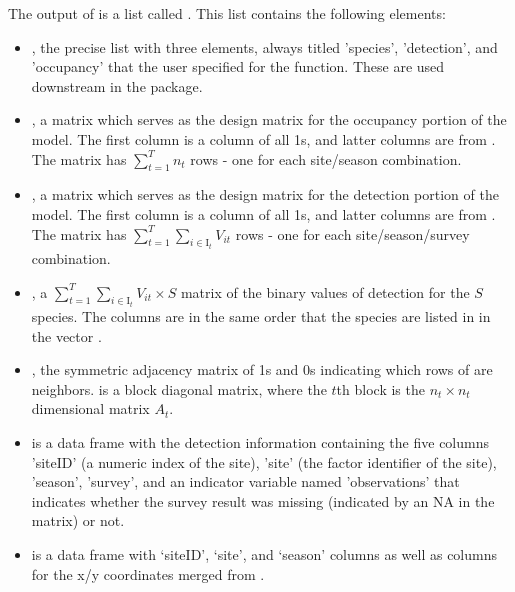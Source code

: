 The output of  is a list called .  This list contains the following elements:
\begin{itemize}
\item {}, the precise list with three elements, always titled 'species', 'detection', and 'occupancy' that the user specified for the  function.  These are used downstream in the package.

\item {}, a matrix which serves as the design matrix for the occupancy portion of the model.  The first column is a column of all 1s, and latter columns are from . The matrix has $\sum_{t=1}^T n_t$ rows - one for each site/season combination.
    
\item {}, a matrix which serves as the design matrix for the detection portion of the model.  The first column is a column of all 1s, and latter columns are from . The matrix has $\sum_{t=1}^T \sum_{i \in \mathrm{I}_t}V_{it}$ rows - one for each site/season/survey combination.
    
\item {}, a $\sum_{t=1}^T \sum_{i \in \mathrm{I}_t}V_{it} \times S$ matrix of the binary values of detection for the $S$ species. The columns are in the same order that the species are listed in in the vector .

\item {}, the symmetric adjacency matrix of 1s and 0s indicating which rows of  are neighbors.  is a block diagonal matrix, where the $t$th block is the $n_t \times n_t$ dimensional matrix $A_t$. 
    
\item {} is a data frame with the detection information containing the five columns 'siteID' (a numeric index of the site), 'site' (the factor identifier of the site), 'season', 'survey', and an indicator variable named 'observations' that indicates whether the survey result was missing (indicated by an NA in the  matrix) or not.
    
\item {} is a data frame with `siteID', `site', and `season' columns as well as columns for the x/y coordinates merged from .
\end{itemize}

